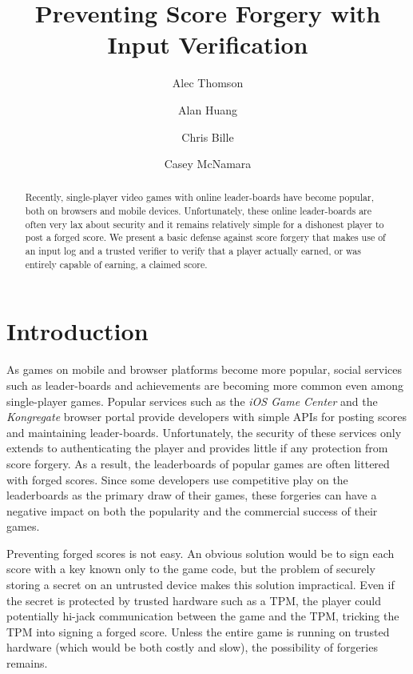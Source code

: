 \documentclass [11pt, twocolumn] {article}
\begin{document}
 

\title { Preventing Score Forgery with Input Verification } 
\author{ Alec Thomson \and Alan Huang \and Chris Bille \and Casey McNamara}
\date {}

\maketitle 

\begin{abstract}
Recently, single-player video games with online leader-boards have become popular, both on browsers and mobile devices. Unfortunately, these online leader-boards are often very lax about security and it remains relatively simple for a dishonest player to post a forged score. We present a basic defense against score forgery that makes use of an input log and a trusted verifier to verify that a player actually earned, or was entirely capable of earning, a claimed score. 
\end{abstract}

\section { Introduction }

As games on mobile and browser platforms become more popular, social services such as leader-boards and achievements are becoming more common even among single-player games. Popular services such as the \emph {iOS Game Center} and the \emph {Kongregate} browser portal provide developers with simple APIs for posting scores and maintaining leader-boards. Unfortunately, the security of these services only extends to authenticating the player and provides little if any protection from score forgery. As a result, the leaderboards of popular games are often littered with forged scores. Since some developers use competitive play on the leaderboards as the primary draw of their games, these forgeries can have a negative impact on both the popularity and the commercial success of their games.

Preventing forged scores is not easy. An obvious solution would be to sign each score with a key known only to the game code, but the problem of  securely storing a secret on an untrusted device makes this solution impractical. Even if the secret is protected by trusted hardware such as a TPM, the player could potentially hi-jack communication between the game and the TPM, tricking the TPM into signing a forged score. Unless the entire game is running on trusted hardware (which would be both costly and slow), the possibility of forgeries remains.
\end{document}
